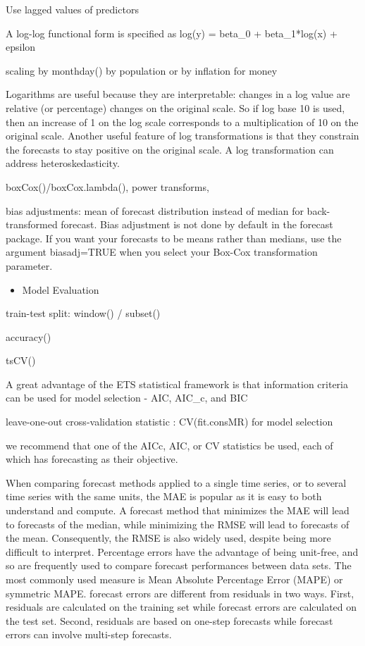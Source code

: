 \documentclass[]{book}
\providecommand{\tightlist}{%
  \setlength{\itemsep}{0pt}\setlength{\parskip}{0pt}}
\theoremstyle{definition}
\theoremstyle{definition}
\theoremstyle{definition}
\theoremstyle{remark}
\begin{document}
Use lagged values of predictors

A log-log functional form is specified as log(y) = beta\_0 +
beta\_1*log(x) + epsilon

scaling by monthday() by population or by inflation for money

Logarithms are useful because they are interpretable: changes in a log
value are relative (or percentage) changes on the original scale. So if
log base 10 is used, then an increase of 1 on the log scale corresponds
to a multiplication of 10 on the original scale. Another useful feature
of log transformations is that they constrain the forecasts to stay
positive on the original scale. A log transformation can address
heteroskedasticity.

boxCox()/boxCox.lambda(), power transforms,

bias adjustments: mean of forecast distribution instead of median for
back-transformed forecast. Bias adjustment is not done by default in the
forecast package. If you want your forecasts to be means rather than
medians, use the argument biasadj=TRUE when you select your Box-Cox
transformation parameter.

\begin{itemize}
\tightlist
\item
  Model Evaluation
\end{itemize}

train-test split: window() / subset()

accuracy()

tsCV()

A great advantage of the ETS statistical framework is that information
criteria can be used for model selection - AIC, AIC\_c, and BIC

leave-one-out cross-validation statistic : CV(fit.consMR) for model
selection

we recommend that one of the AICc, AIC, or CV statistics be used, each
of which has forecasting as their objective.

When comparing forecast methods applied to a single time series, or to
several time series with the same units, the MAE is popular as it is
easy to both understand and compute. A forecast method that minimizes
the MAE will lead to forecasts of the median, while minimizing the RMSE
will lead to forecasts of the mean. Consequently, the RMSE is also
widely used, despite being more difficult to interpret. Percentage
errors have the advantage of being unit-free, and so are frequently used
to compare forecast performances between data sets. The most commonly
used measure is Mean Absolute Percentage Error (MAPE) or symmetric MAPE.
forecast errors are different from residuals in two ways. First,
residuals are calculated on the training set while forecast errors are
calculated on the test set. Second, residuals are based on one-step
forecasts while forecast errors can involve multi-step forecasts.
\end{document}
